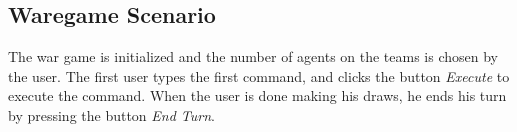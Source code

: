 \subsection{Waregame Scenario}

The war game is initialized and the number of agents on the teams is chosen by the user. The first user types the first command, and clicks the button \textit{Execute} to execute the command. When the user is done making his draws, he ends his turn by pressing the button \textit{End Turn}.
